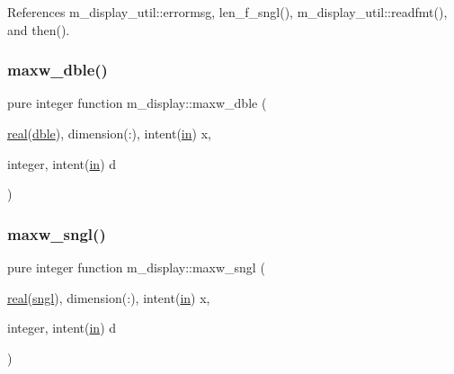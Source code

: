 References m\+\_\+display\+\_\+util\+::errormsg, len\+\_\+f\+\_\+sngl(), m\+\_\+display\+\_\+util\+::readfmt(), and then().

\mbox{\label{namespacem__display_a40bc69658b0fa714777f4b2b5477ee83}} 
\subsubsection{\texorpdfstring{maxw\+\_\+dble()}{maxw\_dble()}}
{\footnotesize\ttfamily pure integer function m\+\_\+display\+::maxw\+\_\+dble (\begin{DoxyParamCaption}\item[{\hyperlink{read__watch_83_8txt_abdb62bde002f38ef75f810d3a905a823}{real}(\hyperlink{namespacem__display_a46d90b75b6ccef7ccade133e5847e815}{dble}), dimension(\+:), intent(\hyperlink{M__journal_83_8txt_afce72651d1eed785a2132bee863b2f38}{in})}]{x,  }\item[{integer, intent(\hyperlink{M__journal_83_8txt_afce72651d1eed785a2132bee863b2f38}{in})}]{d }\end{DoxyParamCaption})\hspace{0.3cm}{\ttfamily [private]}}

\mbox{\label{namespacem__display_a7d542f36f022c67f2879318796f82e57}} 
\subsubsection{\texorpdfstring{maxw\+\_\+sngl()}{maxw\_sngl()}}
{\footnotesize\ttfamily pure integer function m\+\_\+display\+::maxw\+\_\+sngl (\begin{DoxyParamCaption}\item[{\hyperlink{read__watch_83_8txt_abdb62bde002f38ef75f810d3a905a823}{real}(\hyperlink{namespacem__display_a2ac86bc535c3ccc5947dbb3109c666b5}{sngl}), dimension(\+:), intent(\hyperlink{M__journal_83_8txt_afce72651d1eed785a2132bee863b2f38}{in})}]{x,  }\item[{integer, intent(\hyperlink{M__journal_83_8txt_afce72651d1eed785a2132bee863b2f38}{in})}]{d }\end{DoxyParamCaption})\hspace{0.3cm}{\ttfamily [private]}}

